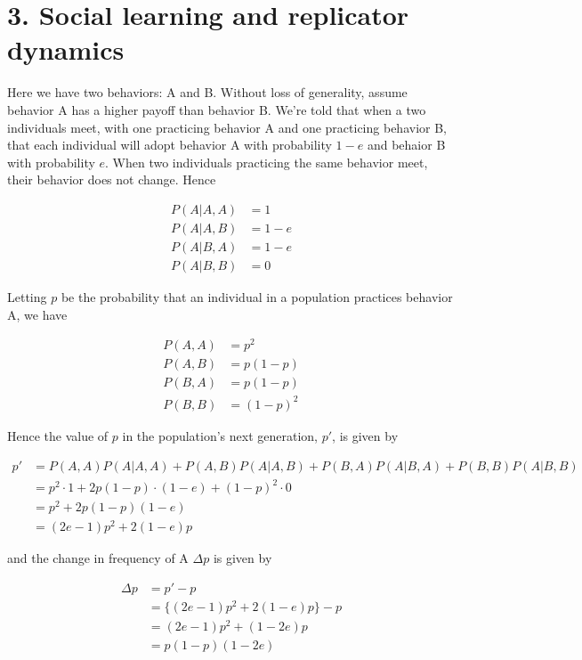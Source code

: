 \documentclass{article}
\begin{document}
\section*{3. Social learning and replicator dynamics}

Here we have two behaviors: A and B. Without loss of generality, assume
behavior A has a higher payoff than behavior B. We're told that when a
two individuals meet, with one practicing behavior A and one practicing
behavior B, that each individual will adopt behavior A with probability
$1 - e$ and behaior B with probability $e$. When two individuals
practicing the same behavior meet, their behavior does not change. Hence

\begin{align*}
    P(A|A,A) &= 1 \\
    P(A|A,B) &= 1 - e \\
    P(A|B,A) &= 1 - e \\
    P(A|B,B) &= 0
\end{align*}

Letting $p$ be the probability that an individual in a population
practices behavior A, we have

\begin{align*}
    P(A,A) &= p^2 \\
    P(A,B) &= p(1 - p) \\
    P(B,A) &= p(1 - p) \\
    P(B,B) &= (1 - p)^2
\end{align*}

Hence the value of $p$ in the population's next generation, $p'$, is
given by

\begin{align*}
    p' &= P(A,A)P(A|A,A) + P(A,B)P(A|A,B) + P(B,A)P(A|B,A) + P(B,B)P(A|B,B) \\
       &= p^2 \cdot 1 + 2p(1 - p) \cdot (1 - e) + (1 - p)^2 \cdot 0 \\
       &= p^2 + 2p(1 - p)(1 - e) \\
       &= (2e - 1)p^2 + 2(1 - e)p
\end{align*}

and the change in frequency of A $\Delta p$ is given by

\begin{align*}
    \Delta p &= p' - p \\
             &= \{(2e - 1)p^2 + 2(1 - e)p\} - p \\
             &= (2e - 1)p^2 + (1 - 2e)p \\
             &= p(1 - p)(1 - 2e)
\end{align*}
\end{document}
